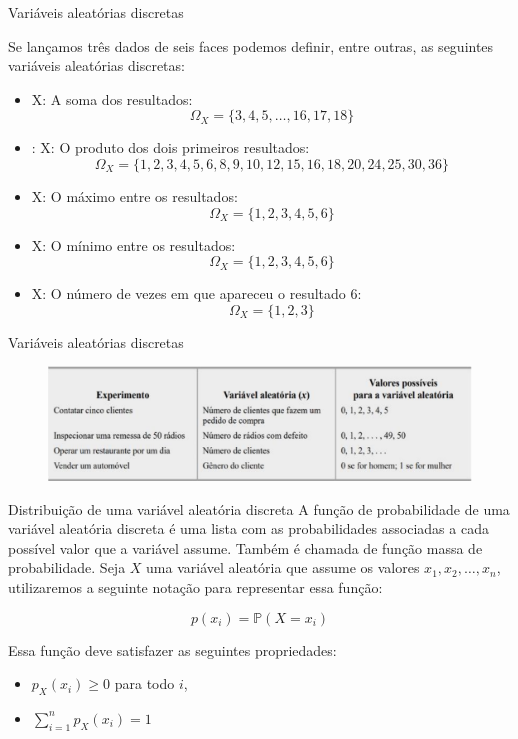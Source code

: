 \begin{frame}{Variáveis aleatórias discretas}
\begin{exemplo}[10]
    Se lançamos três dados de seis faces podemos definir, entre outras, as seguintes variáveis aleatórias discretas:
    \begin{itemize}
        \item X: A soma dos resultados:
            $$\Omega_X = \{3,4,5,\dots, 16,17,18\}$$
        \item: X: O produto dos dois primeiros resultados:
            $$\Omega_X = \{1, 2, 3, 4, 5, 6, 8, 9, 10, 12, 15, 16, 18, 20, 24, 25, 30, 36\}$$
            \item X: O máximo entre os resultados:
            $$\Omega_X = \{1,2,3,4,5,6\}$$
            \item X: O mínimo entre os resultados:
            $$\Omega_X =  \{1,2,3,4,5,6\}$$
            \item X: O número de vezes em que apareceu o resultado 6:
            $$\Omega_X =  \{1,2,3\}$$
    \end{itemize}
\end{exemplo}
\end{frame}

\begin{frame}{Variáveis aleatórias discretas}
    \begin{exemplo}
        \begin{figure}
            \centering
            \includegraphics[width=1\linewidth]{figures/tab_exemplo_va_discreta.png}
        \end{figure}
    \end{exemplo}
\end{frame}

\begin{frame}{Distribuição de uma variável aleatória discreta}
    A função de probabilidade de uma variável aleatória discreta é uma lista com as probabilidades associadas a cada possível valor que a variável assume. Também é chamada de função massa de probabilidade. Seja $X$ uma variável aleatória que assume os valores $x_1, x_2, \dots, x_n$, utilizaremos a seguinte notação para representar essa função:

    $$p(x_i) = \mathds{P}(X=x_i)$$

    Essa função deve satisfazer as seguintes propriedades:

\begin{itemize}
    \item $p_X(x_i) \geq 0$ para todo $i$,
    \item $\sum_{i=1}^{n} p_X(x_i) = 1$
\end{itemize}
\end{frame}

